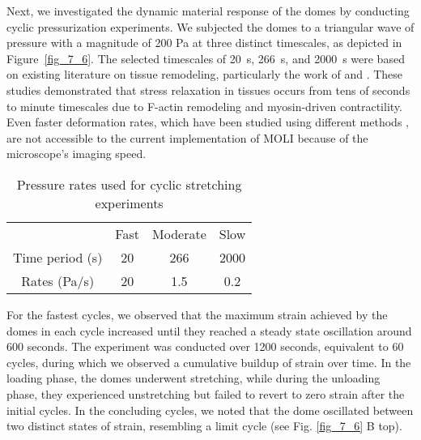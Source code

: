 Next, we investigated the dynamic material response of the domes by conducting cyclic pressurization experiments. We subjected the domes to a triangular wave of pressure with a magnitude of 200 Pa at three distinct timescales, as depicted in Figure~\ref{fig_7_6}. The selected timescales of 20~s, 266~s, and 2000~s were based on existing literature on tissue remodeling, particularly the work of \citet{khalilgharibi2019} and \citet{casares2015}. These studies demonstrated that stress relaxation in tissues occurs from tens of seconds to minute timescales due to F-actin remodeling and myosin-driven contractility. Even faster deformation rates, which have been studied using different methods \cite{khalilgharibi2019}, are not accessible to the current implementation of MOLI because of the microscope’s imaging speed.
\begin{center}
	\begin{table}[h!]
		\label{tab:hysteresis}
		\centering
		\begin{tabular}{c c c c}
			& Fast & Moderate & Slow \\ 
			Time period (s) & 20   & 266      & 2000 \\ 
			Rates (Pa/s)    & 20   & 1.5      & 0.2  \\ 
		\end{tabular}
		\caption{Pressure rates used for cyclic stretching experiments}
	\end{table}
\end{center}
\vspace{-2em}

For the fastest cycles, we observed that the maximum strain achieved by the domes in each cycle increased until they reached a steady state oscillation around 600 seconds.
The experiment was conducted over 1200 seconds, equivalent to 60 cycles, during which we observed a cumulative buildup of strain over time. In the loading phase, the domes underwent stretching, while during the unloading phase, they experienced unstretching but failed to revert to zero strain after the initial cycles. In the concluding cycles, we noted that the dome oscillated between two distinct states of strain, resembling a limit cycle (see Fig. \ref{fig_7_6} B top).

